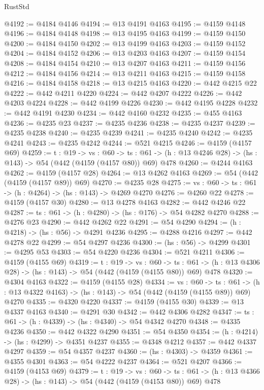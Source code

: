 \begin{lexlean}{RustStd}
\begin{coremodule}
@4192 := @4184 @4146
@4194 := @13 @4191 @4163
@4195 := @4159 @4148
@4196 := @4184 @4148
@4198 := @13 @4195 @4163
@4199 := @4159 @4150
@4200 := @4184 @4150
@4202 := @13 @4199 @4163
@4203 := @4159 @4152
@4204 := @4184 @4152
@4206 := @13 @4203 @4163
@4207 := @4159 @4154
@4208 := @4184 @4154
@4210 := @13 @4207 @4163
@4211 := @4159 @4156
@4212 := @4184 @4156
@4214 := @13 @4211 @4163
@4215 := @4159 @4158
@4216 := @4184 @4158
@4218 := @13 @4215 @4163
@4220 := @442 @4215 @22
@4222 := @442 @4211 @4220
@4224 := @442 @4207 @4222
@4226 := @442 @4203 @4224
@4228 := @442 @4199 @4226
@4230 := @442 @4195 @4228
@4232 := @442 @4191 @4230
@4234 := @442 @4160 @4232
@4235 := @455 @4163
@4236 := @4235 @23
@4237 := @4235 @4236
@4238 := @4235 @4237
@4239 := @4235 @4238
@4240 := @4235 @4239
@4241 := @4235 @4240
@4242 := @4235 @4241
@4243 := @4235 @4242
@4244 := @521 @4215
@4246 := @4159 (@4157 @69)
@4259 := {t : @19} ->
  {vs : @60} ->
  {ts : @61} -> (h : @13 @4246 @28) -> (hs : @143) -> @54 (@442 (@4159 (@4157 @80)) @69) @478
@4260 := @4244 @4163
@4262 := @4159 (@4157 @28)
@4264 := @13 @4262 @4163
@4269 := @54 (@442 (@4159 (@4157 @89)) @69)
@4270 := @4235 @28
@4275 := {vs : @60} -> {ts : @61} -> (h : @4264) -> (hs : @143) -> @4269 @4270
@4276 := @4260 @22
@4278 := @4159 (@4157 @30)
@4280 := @13 @4278 @4163
@4282 := @442 @4246 @22
@4287 := {ts : @61} -> (h : @4280) -> (hs : @176) -> @54 @4282 @4270
@4288 := @4276 @23
@4290 := @442 @4262 @22
@4291 := @54 @4290
@4294 := (h : @4218) -> (hs : @56) -> @4291 @4236
@4295 := @4288 @4216
@4297 := @442 @4278 @22
@4299 := @54 @4297 @4236
@4300 := (hs : @56) -> @4299
@4301 := @4295 @53
@4303 := @54 @4220 @4236
@4304 := @521 @4211
@4306 := @4159 (@4155 @69)
@4319 := {t : @19} ->
  {vs : @60} ->
  {ts : @61} -> (h : @13 @4306 @28) -> (hs : @143) -> @54 (@442 (@4159 (@4155 @80)) @69) @478
@4320 := @4304 @4163
@4322 := @4159 (@4155 @28)
@4334 := {vs : @60} ->
  {ts : @61} -> (h : @13 @4322 @4163) -> (hs : @143) -> @54 (@442 (@4159 (@4155 @89)) @69) @4270
@4335 := @4320 @4220
@4337 := @4159 (@4155 @30)
@4339 := @13 @4337 @4163
@4340 := @4291 @30
@4342 := @442 @4306 @4282
@4347 := {ts : @61} -> (h : @4339) -> (hs : @4340) -> @54 @4342 @4270
@4348 := @4335 @4236
@4350 := @442 @4322 @4290
@4351 := @54 @4350
@4354 := (h : @4214) -> (hs : @4299) -> @4351 @4237
@4355 := @4348 @4212
@4357 := @442 @4337 @4297
@4359 := @54 @4357 @4237
@4360 := (hs : @4303) -> @4359
@4361 := @4355 @4301
@4363 := @54 @4222 @4237
@4364 := @521 @4207
@4366 := @4159 (@4153 @69)
@4379 := {t : @19} ->
  {vs : @60} ->
  {ts : @61} -> (h : @13 @4366 @28) -> (hs : @143) -> @54 (@442 (@4159 (@4153 @80)) @69) @478

\end{coremodule}
\end{lexlean}
